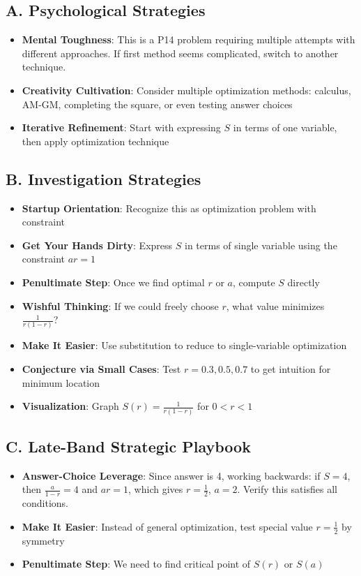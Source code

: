 \documentclass[12pt]{article}
\begin{document}
\begin{strategicbox}
\subsection*{A. Psychological Strategies}
\begin{itemize}[leftmargin=*]
    \item \textbf{Mental Toughness}: This is a P14 problem requiring multiple attempts with different approaches. If first method seems complicated, switch to another technique.
    \item \textbf{Creativity Cultivation}: Consider multiple optimization methods: calculus, AM-GM, completing the square, or even testing answer choices
    \item \textbf{Iterative Refinement}: Start with expressing $S$ in terms of one variable, then apply optimization technique
\end{itemize}

\subsection*{B. Investigation Strategies}
\begin{itemize}[leftmargin=*]
    \item \textbf{Startup Orientation}: Recognize this as optimization problem with constraint
    \item \textbf{Get Your Hands Dirty}: Express $S$ in terms of single variable using the constraint $ar = 1$
    \item \textbf{Penultimate Step}: Once we find optimal $r$ or $a$, compute $S$ directly
    \item \textbf{Wishful Thinking}: If we could freely choose $r$, what value minimizes $\frac{1}{r(1-r)}$?
    \item \textbf{Make It Easier}: Use substitution to reduce to single-variable optimization
    \item \textbf{Conjecture via Small Cases}: Test $r = 0.3, 0.5, 0.7$ to get intuition for minimum location
    \item \textbf{Visualization}: Graph $S(r) = \frac{1}{r(1-r)}$ for $0 < r < 1$
\end{itemize}

\subsection*{C. Late-Band Strategic Playbook}
\begin{itemize}[leftmargin=*]
    \item \textbf{Answer-Choice Leverage}: Since answer is 4, working backwards: if $S=4$, then $\frac{a}{1-r}=4$ and $ar=1$, which gives $r=\frac{1}{2}$, $a=2$. Verify this satisfies all conditions.
    \item \textbf{Make It Easier}: Instead of general optimization, test special value $r=\frac{1}{2}$ by symmetry
    \item \textbf{Penultimate Step}: We need to find critical point of $S(r)$ or $S(a)$
\end{itemize}


\end{strategicbox}
\end{document}
